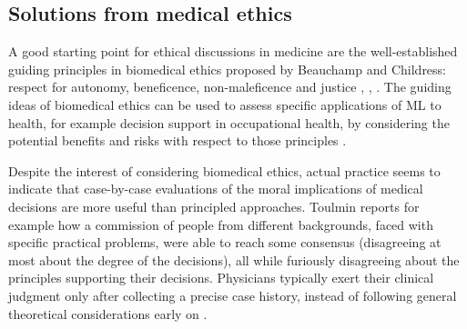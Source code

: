 \subsection{Solutions from medical ethics}
    A good starting point for ethical discussions in medicine are the well-established guiding principles in biomedical ethics proposed by Beauchamp and Childress: respect for autonomy, beneficence, non-maleficence and justice \cite{Dijkstra2020}, \cite{Morley2020}, \cite{Rajkomar2018}.
    The guiding ideas of biomedical ethics can be used to assess specific applications of ML to health, for example decision support in occupational health, by considering the potential benefits and risks with respect to those principles \cite{Dijkstra2020}.

    Despite the interest of considering biomedical ethics, actual practice seems to indicate that case-by-case evaluations of the moral implications of medical decisions are more useful than principled approaches.
    Toulmin\cite{Toulmin1982} reports for example how a commission of people from different backgrounds, faced with specific practical problems, were able to reach some consensus (disagreeing at most about the degree of the decisions), all while furiously disagreeing about the principles supporting their decisions.
    Physicians typically exert their clinical judgment only after collecting a precise case history, instead of following general theoretical considerations early on \cite{Toulmin1982}.

